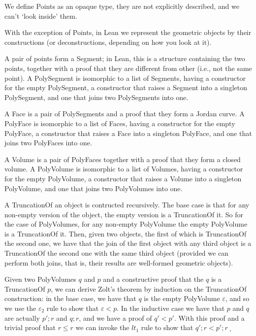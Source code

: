 \documentclass[11pt]{article}
\author{bruno cuconato}
\date{\today}
\title{}
\begin{document}
We define Points as an opaque type, they are not explicitly described,
and we can't ‘look inside’ them.

With the exception of Points, in Lean we represent the geometric
objects by their constructions (or deconstructions, depending on how
you look at it).

A pair of points form a Segment; in Lean, this is a structure
containing the two points, together with a proof that they are
different from other (i.e., not the same point). A PolySegment is
isomorphic to a list of Segments, having a constructor for the empty
PolySegment, a constructor that raises a Segment into a singleton
PolySegment, and one that joins two PolySegments into one.

A Face is a pair of PolySegments and a proof that they form a Jordan
curve. A PolyFace is isomorphic to a list of Faces, having a
constructor for the empty PolyFace, a constructor that raises a Face
into a singleton PolyFace, and one that joins two PolyFaces into one.

A Volume is a pair of PolyFaces together with a proof that they form a
closed volume. A PolyVolume is isomorphic to a list of Volumes, having
a constructor for the empty PolyVolume, a constructor that raises a
Volume into a singleton PolyVolume, and one that joins two PolyVolumes
into one.

A TruncationOf an object is contructed recursively. The base case is
that for any non-empty version of the object, the empty version is a
TruncationOf it. So for the case of PolyVolumes, for any non-empty
PolyVolume the empty PolyVolume is a TruncationOf it. Then, given two
objects, the first of which is TruncationOf the second one, we have
that the join of the first object with any third object is a
TruncationOf the second one with the same third object (provided we
can perform both joins, that is, their results are well-formed
geometric objects).

Given two PolyVolumes \(q\) and \(p\) and a constructive proof that the
\(q\) is a TruncationOf \(p\), we can derive Zolt's theorem by induction
on the TruncationOf construction: in the base case, we have that \(q\)
is the empty PolyVolume \(\varepsilon\), and so we use the
\(\varepsilon_2\) rule to show that \(\varepsilon < p\). In the inductive
case we have that \(p\) and \(q\) are actually \(p';r\) and \(q;r\), and we
have a proof of \(q' < p'\). With this proof and a trivial proof that \(r
\leq r\) we can invoke the \(lt_1\) rule to show that \(q';r < p';r\;_\square\)
\end{document}
